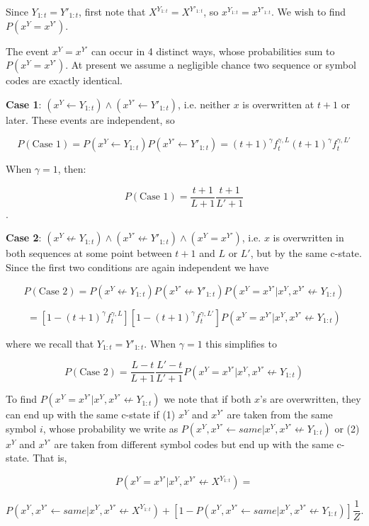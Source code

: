 \documentclass{article}
\begin{document}
Since $Y_{1:t} = Y'_{1:t}$,  first note that $X^{Y_{1:t}} = X^{Y'_{1:t}}$, so $x^{Y_{1:t}} = x^{Y'_{1:t}}$. We wish to find $P(x^Y = x^{Y'})$.

The event $x^Y = x^{Y'}$ can occur in 4 distinct ways, whose probabilities sum to $P(x^Y = x^{Y'})$. At present we assume a negligible chance two sequence or symbol codes are exactly identical.

\textbf{Case 1}: $(x^Y \leftarrow Y_{1:t}) \land (x^{Y'} \leftarrow Y'_{1:t})$, i.e. neither $x$ is overwritten at $t+1$ or later. These events are independent, so

$$P(\textrm{Case 1}) = P(x^Y \leftarrow Y_{1:t})P(x^{Y'} \leftarrow Y'_{1:t}) = (t+1)^\gamma f^{\gamma,L}_t(t+1)^\gamma f^{\gamma,L'}_t$$

When $\gamma = 1$, then:

$$P(\textrm{Case 1}) = \frac{t+1}{L+1}\frac{t+1}{L'+1}$$.

\textbf{Case 2}: $(x^Y \not\leftarrow Y_{1:t}) \land (x^{Y'} \not\leftarrow Y'_{1:t}) \land (x^Y = x^{Y'})$, i.e. $x$ is overwritten in both sequences at some point between $t+1$ and $L$ or $L'$, but by the same c-state. Since the first two conditions are again independent we have

$$P(\textrm{Case 2}) = P(x^Y \not\leftarrow Y_{1:t})P(x^{Y'} \not\leftarrow Y'_{1:t})P(x^Y = x^{Y'}|x^Y, x^{Y'} \not\leftarrow Y_{1:t})$$

$$= [1 - (t+1)^\gamma f^{\gamma,L}_t][1 - (t+1)^\gamma f^{\gamma,L'}_t]P(x^Y = x^{Y'}|x^Y, x^{Y'} \not\leftarrow Y_{1:t})$$

where we recall that $Y_{1:t} = Y'_{1:t}$. When $\gamma = 1$ this simplifies to

$$P(\textrm{Case 2}) = \frac{L-t}{L+1}\frac{L'-t}{L'+1}P(x^Y = x^{Y'}|x^Y, x^{Y'} \not\leftarrow Y_{1:t})$$

To find $P(x^Y = x^{Y'}|x^Y, x^{Y'} \not\leftarrow Y_{1:t})$ we note that if both $x$'s are overwritten, they can end up with the same c-state if (1) $x^Y$ and $x^{Y'}$ are taken from the same symbol $i$, whose probability we write as $P(x^Y, x^{Y'} \leftarrow same|x^Y, x^{Y'} \not\leftarrow Y_{1:t})$ or (2) $x^Y$ and $x^{Y'}$ are taken from different symbol codes but end up with the same c-state. That is,

$$P(x^Y = x^{Y'}|x^Y, x^{Y'} \not\leftarrow X^{Y_{1:t}}) =$$

$$P(x^Y, x^{Y'} \leftarrow same|x^Y, x^{Y'} \not\leftarrow X^{Y_{1:t}}) + [1 - P(x^Y, x^{Y'} \leftarrow same|x^Y, x^{Y'} \not\leftarrow Y_{1:t})]\frac{1}{Z}.$$
\end{document}
